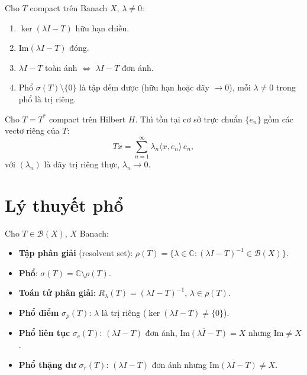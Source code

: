 \documentclass[12pt,a4paper]{article}
\begin{document}
\begin{dinhly}[title={Lý thuyết Fredholm--Riesz}]
  Cho $T$ compact trên Banach $X$, $\lambda \ne 0$:
  \begin{enumerate}
    \item $\ker(\lambda I - T)$ hữu hạn chiều.
    \item $\text{Im}(\lambda I - T)$ đóng.
    \item $\lambda I - T$ toàn ánh $\Leftrightarrow$ $\lambda I - T$ đơn ánh.
    \item Phổ $\sigma(T) \setminus \{0\}$ là tập đếm được (hữu hạn hoặc dãy $\to 0$), mỗi $\lambda \ne 0$ trong phổ là trị riêng.
  \end{enumerate}
\end{dinhly}

\begin{dinhly}[title={Định lý phổ (Hilbert--Schmidt)}]
  Cho $T = T^*$ compact trên Hilbert $H$. Thì tồn tại cơ sở trực chuẩn $\{e_n\}$ gồm các vectơ riêng của $T$:
  \[
    Tx = \sum_{n=1}^{\infty} \lambda_n \langle x, e_n \rangle\, e_n,
  \]
  với $(\lambda_n)$ là dãy trị riêng thực, $\lambda_n \to 0$.
\end{dinhly}

\section{Lý thuyết phổ}

\begin{dinhnghia}
  Cho $T \in \mathcal{B}(X)$, $X$ Banach:
  \begin{itemize}
    \item \textbf{Tập phân giải} (resolvent set): $\rho(T) = \{\lambda \in \mathbb{C} : (\lambda I - T)^{-1} \in \mathcal{B}(X)\}$.
    \item \textbf{Phổ}: $\sigma(T) = \mathbb{C} \setminus \rho(T)$.
    \item \textbf{Toán tử phân giải}: $R_\lambda(T) = (\lambda I - T)^{-1}$, $\lambda \in \rho(T)$.
  \end{itemize}
\end{dinhnghia}

\begin{dinhnghia}[title={Phân loại phổ}]
  \begin{itemize}
    \item \textbf{Phổ điểm} $\sigma_p(T)$: $\lambda$ là trị riêng ($\ker(\lambda I - T) \ne \{0\}$).
    \item \textbf{Phổ liên tục} $\sigma_c(T)$: $(\lambda I - T)$ đơn ánh, $\overline{\text{Im}(\lambda I - T)} = X$ nhưng $\text{Im} \ne X$.
    \item \textbf{Phổ thặng dư} $\sigma_r(T)$: $(\lambda I - T)$ đơn ánh nhưng $\overline{\text{Im}(\lambda I - T)} \ne X$.
  \end{itemize}
\end{dinhnghia}
\end{document}
